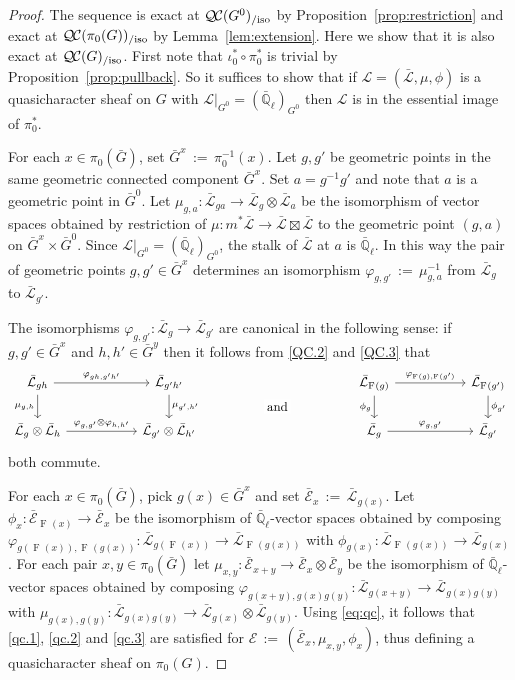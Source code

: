 \documentclass{amsart}
\theoremstyle{plain}
\theoremstyle{definition}
\theoremstyle{remark}
\newcommand{\EE}{\mathbb{\bar Q}_\ell}
\newcommand{\Frob}[1]{\operatorname{F}_{#1}}
\newcommand{\ceq}{{\, :=\, }}
\newcommand{\qcs}[1]{{\mathcal{#1}}}
\newcommand{\gqcs}[1]{{\mathcal{\bar #1}}}
\newcommand{\QC}{{\mathcal{Q\hskip-0.8pt C}}}
\newcommand{\QCiso}[1]{\QC(#1)_{/\text{iso}}}
\newcommand{\bG}{\bar{G}}
\begin{document}
\begin{proof}
The sequence is exact at $\QCiso{G^0}$ by Proposition~\ref{prop:restriction}
and exact at $\QCiso{\pi_0(G)}$ by Lemma~\ref{lem:extension}.
Here we show that it is also exact at $\QCiso{G}$.
First note that $\iota_0^* \circ \pi_0^*$ is trivial by Proposition~\ref{prop:pullback}.
So it suffices to show that if $\qcs{L} = (\gqcs{L},\mu,\phi)$ is a quasicharacter sheaf on $G$
with $\qcs{L}\vert_{G^0} = (\EE)_{G^0}$ then $\qcs{L}$ is in the essential image of $\pi_0^*$.

For each $x\in \pi_0(\bG)$, set $\bG^x \ceq \pi_0^{-1}(x)$.
Let $g, g'$ be geometric points in the same
geometric connected component $\bG^x$.
Set $a = g^{-1}g'$ and note that $a$ is a geometric point in $\bG^0$.
Let $\mu_{g,a} : \gqcs{L}_{ga} \to \gqcs{L}_g \otimes \gqcs{L}_a$
be the isomorphism of vector spaces obtained by restriction of
$\mu : m^*\gqcs{L} \to \gqcs{L} \boxtimes \gqcs{L}$ to the
geometric point $(g,a)$ on $\bG^x \times \bG^0$.
Since $\qcs{L}\vert_{G^0} = (\EE)_{G^0}$,
the stalk of $\gqcs{L}$ at $a$ is $\EE$.
In this way the pair of geometric points $g, g' \in \bG^x$
determines an isomorphism $\varphi_{g,g'} \ceq \mu_{g,a}^{-1}$
from $\gqcs{L}_{g}$ to $\gqcs{L}_{g'}$.

The isomorphisms $\varphi_{g,g'}: \gqcs{L}_{g} \to \gqcs{L}_{g'}$ are canonical
in the following sense: if $g,g'\in \bG^x$ and $h,h'\in \bG^y$
then it follows from \ref{QC.2} and \ref{QC.3}
that
 \begin{equation}\label{eq:qc}
  \begin{tikzcd}[column sep=55]
   \gqcs{L}_{gh} \arrow{r}{\varphi_{gh,g'h'}} \arrow[swap]{d}{\mu_{g,h}}
  & \gqcs{L}_{g'h'} \arrow{d}{\mu_{g',h'}}
  &\arrow[draw=none]{d}[pos=.4,description]{\text{\normalsize{and}}}
  &  \gqcs{L}_{\Frob{}(g)} \arrow{r}{\varphi_{\Frob{}(g),\Frob{}(g')}} \arrow[swap]{d}{\phi_{g}} & \gqcs{L}_{\Frob{}(g')} \arrow{d}{\phi_{g'}} \\
  \gqcs{L}_{g} \otimes \gqcs{L}_{h} \arrow{r}{\varphi_{g,g'}\otimes \varphi_{h,h'}}
  & \gqcs{L}_{g'} \otimes \gqcs{L}_{h'}
  & {}
  & \gqcs{L}_{g} \arrow{r}{\varphi_{g,g'}} & \gqcs{L}_{g'}
  \end{tikzcd}
 \end{equation}
both commute.

For each $x\in \pi_0(\bG)$, pick $g(x)\in \bG^x$
and set $\gqcs{E}_x \ceq \gqcs{L}_{g(x)}$.
Let $\phi_x : \gqcs{E}_{\Frob{}(x)} \to \gqcs{E}_x$
be the isomorphism of $\EE$-vector spaces obtained by composing
$\varphi_{g(\Frob{}(x)),\Frob{}(g(x))} : \gqcs{L}_{g(\Frob{}(x))} \to \gqcs{L}_{\Frob{}(g(x))}$
with $\phi_{g(x)} : \gqcs{L}_{\Frob{}(g(x))} \to \gqcs{L}_{g(x)}$.
For each pair $x,y\in \pi_0(\bG)$
let $\mu_{x,y} : \gqcs{E}_{x+y}\to \gqcs{E}_x\otimes \gqcs{E}_y$
be the isomorphism of $\EE$-vector spaces obtained by composing
$\varphi_{g(x+y),g(x)g(y)} : \gqcs{L}_{g(x+y)} \to \gqcs{L}_{g(x)g(y)}$
with $\mu_{g(x),g(y)} : \gqcs{L}_{g(x)g(y)} \to \gqcs{L}_{g(x)}\otimes \gqcs{L}_{g(y)}$.
Using \eqref{eq:qc}, it follows that \ref{qc.1}, \ref{qc.2} and \ref{qc.3} are satisfied for
$\qcs{E} \ceq (\gqcs{E}_x, \mu_{x,y}, \phi_x)$, thus defining a quasicharacter sheaf on $\pi_0(G)$.


\end{proof}
\end{document}
